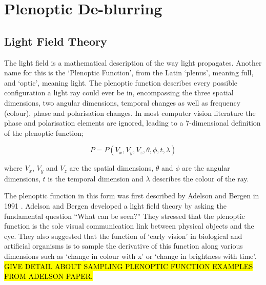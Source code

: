 
\chapter{Plenoptic De-blurring}
\label{chap:plenoptic_deblurring}

\section{Light Field Theory}



The light field is a mathematical description of the way light propagates.
Another name for this is the \enquote*{Plenoptic Function}, from the Latin \enquote*{plenus}, meaning full, and \enquote*{optic}, meaning light.
The plenoptic function describes every possible configuration a light ray could ever be in, encompassing the three spatial dimensions, two angular dimensions, temporal changes as well as frequency (colour), phase and polarisation changes.
In most computer vision literature the phase and polarisation elements are ignored, leading to a 7-dimensional definition of the plenoptic function;

\begin{equation}
\label{eq:plenoptic_function}
P = P(V_x, V_y, V_z, \theta, \phi, t, \lambda)
\end{equation}

where $V_x$, $V_y$ and $V_z$ are the spatial dimensions, $\theta$ and $\phi$ are the angular dimensions, $t$ is the temporal dimension and $\lambda$ describes the colour of the ray. 

The plenoptic function in this form was first described by Adelson and Bergen in 1991 \cite{adelson1991plenoptic}.
Adelson and Bergen developed a light field theory by asking the fundamental question \enquote{What can be seen?} They stressed that the plenoptic function is the sole visual communication link between physical objects and the eye.
They also suggested that the function of \enquote*{early vision} in biological and artificial organisms is to sample the derivative of this function along various dimensions such as \enquote*{change in colour with x} or \enquote*{change in brightness with time}.
\hl{GIVE DETAIL ABOUT SAMPLING PLENOPTIC FUNCTION EXAMPLES FROM ADELSON PAPER.}

